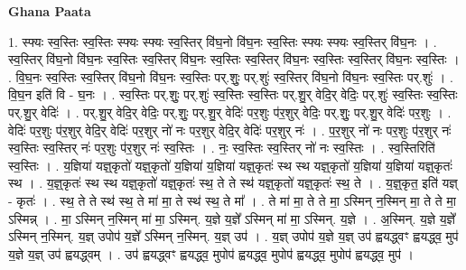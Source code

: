 \documentclass[17pt]{extarticle}
\begin{document}
\textbf{Ghana Paata } \newline

1. स्फ्यः स्व॒स्तिः स्व॒स्तिः स्फ्यः स्फ्यः स्व॒स्तिर् वि॑घ॒नो वि॑घ॒नः स्व॒स्तिः स्फ्यः स्फ्यः स्व॒स्तिर् वि॑घ॒नः । . स्व॒स्तिर् वि॑घ॒नो वि॑घ॒नः स्व॒स्तिः स्व॒स्तिर् वि॑घ॒नः स्व॒स्तिः स्व॒स्तिर् वि॑घ॒नः स्व॒स्तिः स्व॒स्तिर् वि॑घ॒नः स्व॒स्तिः । . वि॒घ॒नः स्व॒स्तिः स्व॒स्तिर् वि॑घ॒नो वि॑घ॒नः स्व॒स्तिः पर्.शुः॒ पर्.शुः॑ स्व॒स्तिर् वि॑घ॒नो वि॑घ॒नः स्व॒स्तिः पर्.शुः॑ । . वि॒घ॒न इति॑ वि - घ॒नः । . स्व॒स्तिः पर्.शुः॒ पर्.शुः॑ स्व॒स्तिः स्व॒स्तिः पर्.शु॒र् वेदि॒र् वेदिः॒ पर्.शुः॑ स्व॒स्तिः स्व॒स्तिः पर्.शु॒र् वेदिः॑ । . पर्.शु॒र् वेदि॒र् वेदिः॒ पर्.शुः॒ पर्.शु॒र् वेदिः॑ पर॒शुः प॑र॒शुर् वेदिः॒ पर्.शुः॒ पर्.शु॒र् वेदिः॑ पर॒शुः । . वेदिः॑ पर॒शुः प॑र॒शुर् वेदि॒र् वेदिः॑ पर॒शुर् नो॑ नः पर॒शुर् वेदि॒र् वेदिः॑ पर॒शुर् नः॑ । . प॒र॒शुर् नो॑ नः पर॒शुः प॑र॒शुर् नः॑ स्व॒स्तिः स्व॒स्तिर् नः॑ पर॒शुः प॑र॒शुर् नः॑ स्व॒स्तिः । . नः॒ स्व॒स्तिः स्व॒स्तिर् नो॑ नः स्व॒स्तिः । . स्व॒स्तिरिति॑ स्व॒स्तिः । . य॒ज्ञिया॑ यज्ञ्॒कृतो॑ यज्ञ्॒कृतो॑ य॒ज्ञिया॑ य॒ज्ञिया॑ यज्ञ्॒कृतः॑ स्थ स्थ यज्ञ्॒कृतो॑ य॒ज्ञिया॑ य॒ज्ञिया॑ यज्ञ्॒कृतः॑ स्थ । . य॒ज्ञ्॒कृतः॑ स्थ स्थ यज्ञ्॒कृतो॑ यज्ञ्॒कृतः॑ स्थ॒ ते ते स्थ॑ यज्ञ्॒कृतो॑ यज्ञ्॒कृतः॑ स्थ॒ ते । . य॒ज्ञ्॒कृत॒ इति॑ यज्ञ् - कृतः॑ । . स्थ॒ ते ते स्थ॑ स्थ॒ ते मा॑ मा॒ ते स्थ॑ स्थ॒ ते मा᳚ । . ते मा॑ मा॒ ते ते मा॒ ऽस्मिन् न॒स्मिन् मा॒ ते ते मा॒ ऽस्मिन्न् । . मा॒ ऽस्मिन् न॒स्मिन् मा॑ मा॒ ऽस्मिन्. य॒ज्ञे य॒ज्ञे᳚ ऽस्मिन् मा॑ मा॒ ऽस्मिन्. य॒ज्ञे । . अ॒स्मिन्. य॒ज्ञे य॒ज्ञे᳚ ऽस्मिन् न॒स्मिन्. य॒ज्ञ् उपोप॑ य॒ज्ञे᳚ ऽस्मिन् न॒स्मिन्. य॒ज्ञ् उप॑ । . य॒ज्ञ् उपोप॑ य॒ज्ञे य॒ज्ञ् उप॑ ह्वयद्ध्वꣳ ह्वयद्ध्व॒ मुप॑ य॒ज्ञे य॒ज्ञ् उप॑ ह्वयद्ध्वम् । . उप॑ ह्वयद्ध्वꣳ ह्वयद्ध्व॒ मुपोप॑ ह्वयद्ध्व॒ मुपोप॑ ह्वयद्ध्व॒ मुपोप॑ ह्वयद्ध्व॒ मुप॑ । \newline
\end{document}
